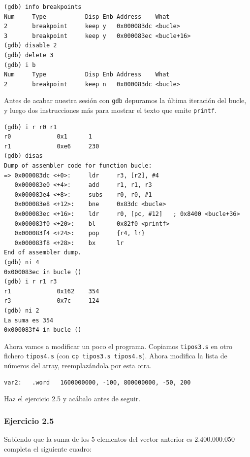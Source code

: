 \begin{lstlisting}
(gdb) info breakpoints
Num     Type           Disp Enb Address    What
2       breakpoint     keep y   0x000083dc <bucle>
3       breakpoint     keep y   0x000083ec <bucle+16>
(gdb) disable 2
(gdb) delete 3
(gdb) i b
Num     Type           Disp Enb Address    What
2       breakpoint     keep n   0x000083dc <bucle>
\end{lstlisting}

Antes de acabar nuestra sesión con {\tt gdb} depuramos la última iteración del bucle,
y luego dos instrucciones más para mostrar el texto que emite {\tt printf}.

\begin{lstlisting}
(gdb) i r r0 r1
r0             0x1      1
r1             0xe6     230
(gdb) disas
Dump of assembler code for function bucle:
=> 0x000083dc <+0>:     ldr     r3, [r2], #4
   0x000083e0 <+4>:     add     r1, r1, r3
   0x000083e4 <+8>:     subs    r0, r0, #1
   0x000083e8 <+12>:    bne     0x83dc <bucle>
   0x000083ec <+16>:    ldr     r0, [pc, #12]   ; 0x8400 <bucle+36>
   0x000083f0 <+20>:    bl      0x82f0 <printf>
   0x000083f4 <+24>:    pop     {r4, lr}
   0x000083f8 <+28>:    bx      lr
End of assembler dump.
(gdb) ni 4
0x000083ec in bucle ()
(gdb) i r r1 r3
r1             0x162    354
r3             0x7c     124
(gdb) ni 2
La suma es 354
0x000083f4 in bucle ()
\end{lstlisting}

Ahora vamos a modificar un poco el programa. Copiamos {\tt tipos3.s} en
otro fichero {\tt tipos4.s} (con {\tt cp tipos3.s tipos4.s}). Ahora modifica
la lista de números del array, reemplazándola por esta otra.

\begin{lstlisting}
var2:   .word   1600000000, -100, 800000000, -50, 200
\end{lstlisting}

Haz el ejercicio 2.5 y acábalo antes de seguir.\vspace{0.25cm}

\subsubsection{Ejercicio 2.5}
Sabiendo que la suma de los 5 elementos del vector anterior es
2.400.000.050 completa el siguiente cuadro:


